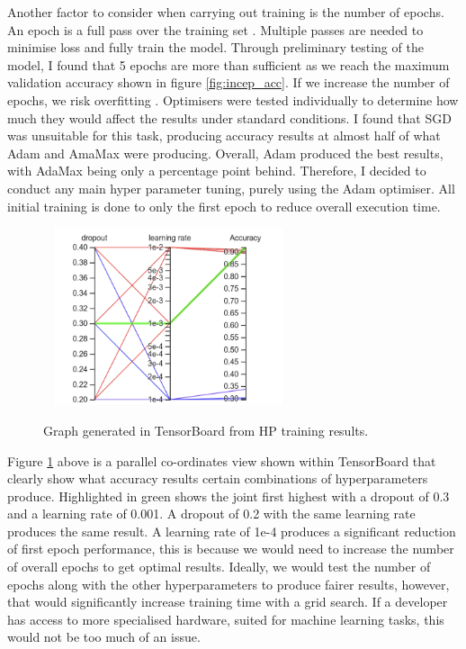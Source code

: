 \documentclass[12pt,a4paper]{report}
\begin{document}
Another factor to consider when carrying out training is the number of epochs. An epoch is a full pass over the training
set \citep{epoch}. Multiple passes are needed to minimise loss and fully train the model. Through preliminary testing 
of the model, 
I found that 5 epochs are more than sufficient as we reach the maximum validation accuracy shown in figure 
\ref{fig:incep_acc}. If we 
increase the number of epochs, we risk overfitting \citep{geeksforgeeks}. Optimisers were tested individually to 
determine how much they would affect the results under standard conditions. I found that SGD was unsuitable for this 
task, producing accuracy results at almost half of what Adam and AmaMax were producing. Overall, Adam produced the best 
results, with AdaMax being only a percentage point behind. Therefore, I decided to conduct any main hyper parameter 
tuning, purely using the Adam optimiser. All initial training is done to only the first epoch to reduce overall 
execution time. 

\begin{figure}[h]\
    \centering
    \includegraphics[width=0.6\textwidth]{cross_graph.png}
    \caption{Graph generated in TensorBoard from HP training results.}
    \label{fig:cross}
\end{figure}

\break

Figure \ref{fig:cross} above is a parallel co-ordinates view shown within TensorBoard that clearly show what accuracy 
results 
certain combinations of hyperparameters produce. Highlighted in green shows the joint first highest with a dropout of 
0.3 and a learning rate of 0.001. A dropout of 0.2 with the same learning rate produces the same result. A learning rate
of 1e-4 produces a significant reduction of first epoch performance, this is because we would need to increase the 
number of overall epochs to get optimal results. Ideally, we would test the number of epochs along with the other 
hyperparameters to produce fairer results, however, that would significantly increase training time with a grid search. 
If a developer has access to more specialised hardware, suited for machine learning tasks, this would not be too much of
an issue.
\end{document}
